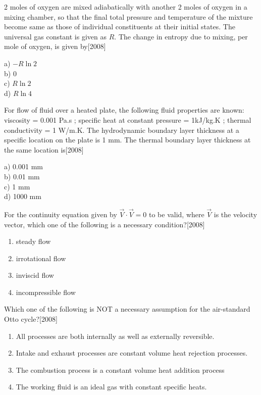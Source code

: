 \item 2 moles of oxygen are mixed adiabatically with another 2 moles of oxygen in a mixing chamber, so that the final total pressure and temperature of the mixture become same as those of individual constituents at their initial states. The universal gas constant is given as $R$. The change in entropy due to mixing, per mole of oxygen, is given by\hfill{[2008]}
\begin{multicols}{4}
     a) $-R\ln{2}$\\
     b) 0\\
     c) $R\ln{2}$\\
     d) $R \ln{4}$
 \end{multicols}
 \item For flow of fluid over a heated plate, the following fluid properties are known:
 viscosity = 0.001 Pa.s ; specific heat at constant pressure = 1kJ/kg.K ; thermal conductivity = 1 W/m.K.
 The hydrodynamic boundary layer thickness at a specific location on the plate is 1 mm. The thermal boundary layer thickness at the same location is\hfill{[2008]}
\begin{multicols}{4}
     a) 0.001 mm\\
     b) 0.01 mm\\
     c) 1 mm\\
     d) 1000 mm
 \end{multicols}
\item For the continuity equation given by $\overrightarrow{V}\cdot \overrightarrow{V}=0$ to be valid, where $\overrightarrow{V}
$ is the velocity vector, which one of the following is a necessary condition?\hfill{[2008]}
\begin{enumerate}
    \item steady flow
    \item irrotational flow
    \item inviscid flow
    \item incompressible flow
\end{enumerate}
\item Which one of the following is NOT a necessary assumption for the air-standard Otto  cycle?\hfill{[2008]}
\begin{enumerate}
    \item All processes are both internally as well as externally reversible.
    \item Intake and exhaust processes are constant volume heat rejection processes.
    \item The combustion process is a constant volume heat addition process
    \item The working fluid is an ideal gas with constant specific heats.
\end{enumerate}

